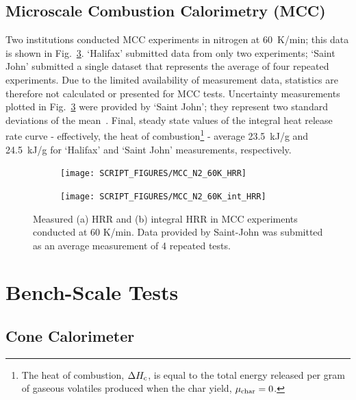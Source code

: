 \documentclass{book}
\begin{document}
\newpage
\subsection{Microscale Combustion Calorimetry (MCC)}

Two institutions conducted MCC experiments in nitrogen at 60~K/min; this data is shown in Fig.~\ref{Fig:MCC_N2_60K}. ‘Halifax’ submitted data from only two experiments; ‘Saint John’ submitted a single dataset that represents the average of four repeated experiments.  Due to the limited availability of measurement data, statistics are therefore not calculated or presented for MCC tests. Uncertainty measurements plotted in Fig.~\ref{Fig:MCC_N2_60K} were provided by ‘Saint John’; they represent two standard deviations of the mean~\cite{fiola2020comparison}. Final, steady state values of the integral heat release rate curve - effectively, the heat of combustion\footnote{The heat of combustion, $\Delta H_{\rm c}$, is equal to the total energy released per gram of gaseous volatiles produced when the char yield, $\mu_{\rm char}=0$.} - average 23.5~kJ/g and 24.5~kJ/g for ‘Halifax’ and ‘Saint John’ measurements, respectively.

\begin{figure}[h]
\centering
\begin{subfigure}[b]{0.75\textwidth}
   \texttt{[image: SCRIPT\_FIGURES/MCC\_N2\_60K\_HRR]}
   \caption{}
   \label{Fig:MCC_N2_60K_HRR}
\end{subfigure}

\begin{subfigure}[b]{0.75\textwidth}
   \texttt{[image: SCRIPT\_FIGURES/MCC\_N2\_60K\_int\_HRR]}
   \caption{}
   \label{Fig:MCC_N2_60K_int_HRR}
\end{subfigure}

  \caption{Measured (a) HRR and (b) integral HRR in MCC experiments conducted at 60 K/min. Data provided by Saint-John was submitted as an average measurement of 4 repeated tests.}
  \label{Fig:MCC_N2_60K}
\end{figure}


\section{Bench-Scale Tests}

\subsection{Cone Calorimeter}
\end{document}
